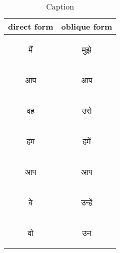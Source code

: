 \documentclass[12pt]{scrartcl}
\begin{document}
\begin{table}[H]
    \centering
    \begin{tabular}{c|c}
direct form & oblique form \\ \hline 
    \begin{hindi}  मैं  \end{hindi} & \begin{hindi}  मुझे \end{hindi}\\
    \begin{hindi}  आप  \end{hindi} & \begin{hindi}  आप \end{hindi}\\
    \begin{hindi}  वह  \end{hindi} & \begin{hindi}  उसे \end{hindi}\\
    \begin{hindi}  हम  \end{hindi} & \begin{hindi}  हमें \end{hindi}\\
    \begin{hindi}  आप  \end{hindi} & \begin{hindi}  आप \end{hindi}\\
    \begin{hindi}  वे  \end{hindi} & \begin{hindi}  उन्हें \end{hindi}\\
    \begin{hindi}  वो  \end{hindi} & \begin{hindi}  उन \end{hindi}\\
    \end{tabular}
    \caption{Caption}
    \label{tab:my_label}
\end{table}
\end{document}
